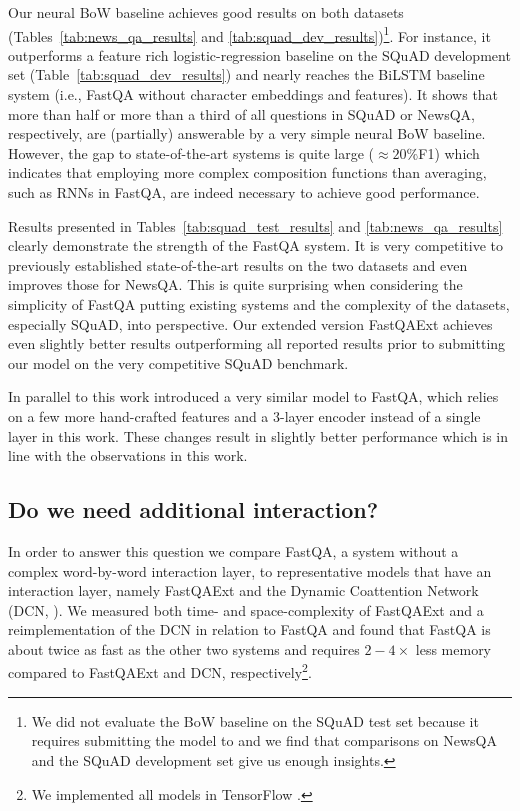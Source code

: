 \documentclass[11pt,a4paper]{article}
\begin{document}
Our neural BoW baseline achieves good results on both datasets (Tables~\ref{tab:news_qa_results} and \ref{tab:squad_dev_results})\footnote{We did not evaluate the BoW baseline on the SQuAD test set because it requires submitting the model to  and we find that comparisons on NewsQA and the SQuAD development set give us enough insights.}. For instance, it outperforms a feature rich logistic-regression baseline on the SQuAD development set (Table~\ref{tab:squad_dev_results}) and nearly reaches the BiLSTM baseline system (i.e., FastQA without character embeddings and features). It shows that more than half or more than a third of all questions in SQuAD or NewsQA, respectively, are (partially) answerable by a very simple neural BoW baseline. However, the gap to state-of-the-art systems is quite large ($\approx20\%$F1) which indicates that employing more complex composition functions than averaging, such as RNNs in FastQA, are indeed necessary to achieve good performance.

Results presented in Tables~\ref{tab:squad_test_results} and \ref{tab:news_qa_results} clearly demonstrate the strength of the FastQA system. It is very competitive to previously established state-of-the-art results on the two datasets and even improves those for NewsQA. This is quite surprising when considering the simplicity of FastQA putting existing systems and the complexity of the datasets, especially SQuAD, into perspective. Our extended version FastQAExt achieves even slightly better results outperforming all reported results prior to submitting our model on the very competitive SQuAD benchmark.

In parallel to this work  introduced a very similar model to FastQA, which relies on a few more hand-crafted features and a 3-layer encoder instead of a single layer in this work. These changes result in slightly better performance which is in line with the observations in this work. 

\subsection{Do we need additional interaction?}

In order to answer this question we compare FastQA, a system without a complex word-by-word interaction layer, to representative models that have an interaction layer, namely FastQAExt and the Dynamic Coattention Network (DCN, ). We measured both time- and space-complexity of FastQAExt and a reimplementation of the DCN in relation to FastQA and found that FastQA is about twice as fast as the other two systems and requires $2-4\times$ less memory compared to FastQAExt and DCN, respectively\footnote{We implemented all models in TensorFlow \cite{Abadi2015}.}.
\end{document}
